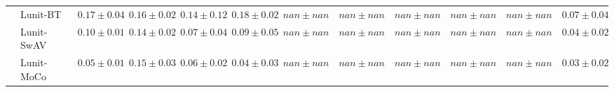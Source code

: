 \begin{tabular}{ll|cccc|c|cccc|c}
 & Lunit-BT~\cite{kang2023benchmarking} & $0.17 \pm 0.04$ & $0.16 \pm 0.02$ & $0.14 \pm 0.12$ & $0.18 \pm 0.02$ & $nan \pm nan$ & $nan \pm nan$ & $nan \pm nan$ & $nan \pm nan$ & $nan \pm nan$ & $0.07 \pm 0.04$ \\
 & Lunit-SwAV~\cite{kang2023benchmarking} & $0.10 \pm 0.01$ & $0.14 \pm 0.02$ & $0.07 \pm 0.04$ & $0.09 \pm 0.05$ & $nan \pm nan$ & $nan \pm nan$ & $nan \pm nan$ & $nan \pm nan$ & $nan \pm nan$ & $0.04 \pm 0.02$ \\
 & Lunit-MoCo~\cite{kang2023benchmarking} & $0.05 \pm 0.01$ & $0.15 \pm 0.03$ & $0.06 \pm 0.02$ & $0.04 \pm 0.03$ & $nan \pm nan$ & $nan \pm nan$ & $nan \pm nan$ & $nan \pm nan$ & $nan \pm nan$ & $0.03 \pm 0.02$ \\
\cline{1-12}
\bottomrule
\end{tabular}
